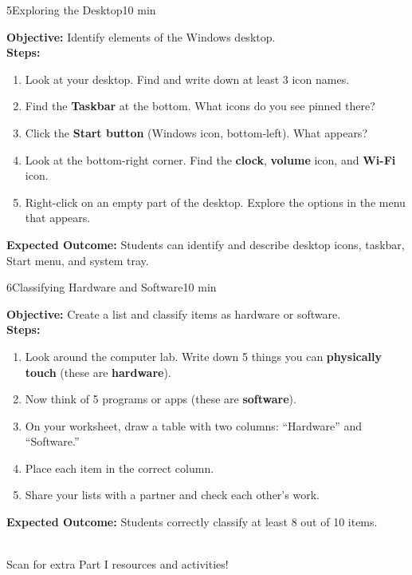 \begin{labactivity}{5}{Exploring the Desktop}{10 min}


\textbf{Objective:} Identify elements of the Windows desktop.\\[4pt]
\textbf{Steps:}
\begin{enumerate}[label=\protect\stepcircle{\arabic*}, leftmargin=2cm, itemsep=4pt]
  \item Look at your desktop. Find and write down at least 3 icon names.
  \item Find the \textbf{Taskbar} at the bottom. What icons do you see pinned there?
  \item Click the \textbf{Start button} (Windows icon, bottom-left). What appears?
  \item Look at the bottom-right corner. Find the \textbf{clock}, \textbf{volume} icon, and \textbf{Wi-Fi} icon.
  \item Right-click on an empty part of the desktop. Explore the options in the menu that appears.
\end{enumerate}
\textbf{Expected Outcome:} Students can identify and describe desktop icons, taskbar, Start menu, and system tray.

\welldone
\end{labactivity}


\begin{labactivity}{6}{Classifying Hardware and Software}{10 min}


\textbf{Objective:} Create a list and classify items as hardware or software.\\[4pt]
\textbf{Steps:}
\begin{enumerate}[label=\protect\stepcircle{\arabic*}, leftmargin=2cm, itemsep=4pt]
  \item Look around the computer lab. Write down 5 things you can \textbf{physically touch} (these are \textbf{hardware}).
  \item Now think of 5 programs or apps (these are \textbf{software}).
  \item On your worksheet, draw a table with two columns: ``Hardware'' and ``Software.''
  \item Place each item in the correct column.
  \item Share your lists with a partner and check each other's work.
\end{enumerate}
\textbf{Expected Outcome:} Students correctly classify at least 8 out of 10 items.

\welldone
\end{labactivity}

\vspace{12pt}
\begin{center}
  \\[6pt]
  {\small\sffamily\textcolor{NavyBlue}{Scan for extra Part I resources and activities!}}
\end{center}
